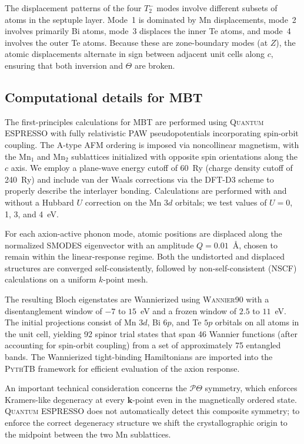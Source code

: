 \documentclass[galley,aps,pra,10pt,amsmath,amssymb,
    superscriptaddress,nofootinbib,longbibliography]{revtex4-2}
\newcounter{comm}
\newcommand{\code}[1]{\textsc{#1}}
\begin{document}
The displacement patterns of the four $T_2^-$ modes involve different subsets of atoms in the septuple layer.
Mode~1 is dominated by Mn displacements, mode~2 involves primarily Bi atoms, mode~3 displaces the inner Te atoms, and mode~4 involves the outer Te atoms.
Because these are zone-boundary modes (at $Z$), the atomic displacements alternate in sign between adjacent unit cells along $c$, ensuring that both inversion and $\Theta$ are broken.

\subsection{Computational details for MBT}

The first-principles calculations for MBT are performed using \code{Quantum ESPRESSO} with fully relativistic PAW pseudopotentials incorporating spin-orbit coupling.
The A-type AFM ordering is imposed via noncollinear magnetism, with the Mn$_1$ and Mn$_2$ sublattices initialized with opposite spin orientations along the $c$ axis.
We employ a plane-wave energy cutoff of 60~Ry (charge density cutoff of 240~Ry) and include van der Waals corrections via the DFT-D3 scheme to properly describe the interlayer bonding.
Calculations are performed with and without a Hubbard $U$ correction on the Mn $3d$ orbitals; we test values of $U = 0$, 1, 3, and 4~eV.

For each axion-active phonon mode, atomic positions are displaced along the normalized \code{SMODES} eigenvector with an amplitude $Q = 0.01$~\AA, chosen to remain within the linear-response regime.
Both the undistorted and displaced structures are converged self-consistently, followed by non-self-consistent (NSCF) calculations on a uniform $k$-point mesh.

The resulting Bloch eigenstates are Wannierized using \code{Wannier90} \cite{marzari1997, marzari2012} with a disentanglement window of $-7$ to $15$~eV and a frozen window of $2.5$ to $11$~eV.
The initial projections consist of Mn $3d$, Bi $6p$, and Te $5p$ orbitals on all atoms in the unit cell, yielding 92 spinor trial states that span 46 Wannier functions (after accounting for spin-orbit coupling) from a set of approximately 75 entangled bands.
The Wannierized tight-binding Hamiltonians are imported into the \code{PythTB} framework \cite{Cole_Python_Tight_Binding_2025} for efficient evaluation of the axion response.

An important technical consideration concerns the $\mathcal{P}\Theta$ symmetry, which enforces Kramers-like degeneracy at every $\mathbf{k}$-point even in the magnetically ordered state.
\code{Quantum ESPRESSO} does not automatically detect this composite symmetry; to enforce the correct degeneracy structure we shift the crystallographic origin to the midpoint between the two Mn sublattices.
\end{document}
